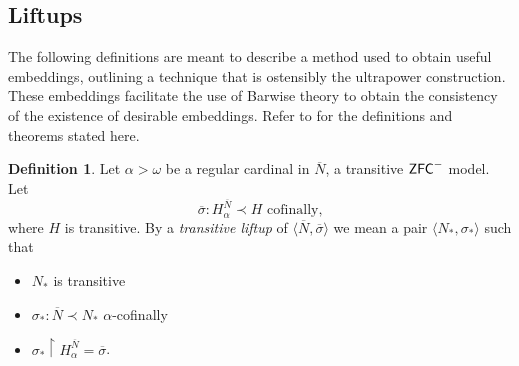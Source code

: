 \documentclass{amsart}
\theoremstyle{definition}
\newtheorem{definition}[theorem]{Definition}
\theoremstyle{remark}
\newcommand{\N}{{\overline{N}}}
\newcommand{\ZFC}{\textup{\ensuremath{\textsf{ZFC}}}}
\begin{document}
\subsection{Liftups}
\label{subsec:Liftups}
The following definitions are meant to describe a method used to obtain useful embeddings, outlining a technique that is ostensibly the ultrapower construction. These embeddings facilitate the use of Barwise theory to obtain the consistency of the existence of desirable embeddings. Refer to \cite[Chapter 1]{Jensen:2012fr} for the definitions and theorems stated here.
	
\begin{definition} Let $\alpha > \omega$ be a regular cardinal in $\N$, a transitive $\ZFC^-$ model. Let 
	$$\overline \sigma: H^{\N}_\alpha \prec H \text{ cofinally,}$$ where $H$ is transitive. By a \emph{transitive liftup} of $\langle \N, \overline \sigma \rangle$ we mean a pair $\langle N_* , \sigma_* \rangle$ such that 
\begin{itemize} 
	\item $N_*$ is transitive
	\item $\sigma_*:\N \prec N_*$ $\alpha$-cofinally
	\item $\sigma_* \upharpoonright H_{\alpha}^{\N}= \overline \sigma$. \qedhere
\end{itemize}	
\end{definition}
\end{document}
